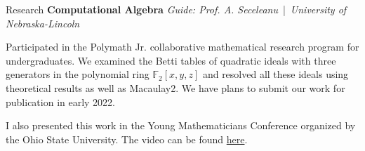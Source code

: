 \begin{rubric}{Research}
\entry*[2021] \textbf{Computational Algebra} \hfill \emph{Guide: Prof. A. Seceleanu} \,|\, \emph{University of Nebraska-Lincoln}

Participated in the Polymath Jr. collaborative mathematical research program for undergraduates. We examined the Betti tables of quadratic ideals with three generators in the polynomial ring $\mathbb{F}_{2}[x, y, z]$ and resolved all these ideals using theoretical results as well as Macaulay2. We have plans to submit our work for publication in early 2022.

I also presented this work in the Young Mathematicians Conference organized by the Ohio State University. The video can be found \href{https://www.youtube.com/watch?v=ax-zScZtL7Q}{here}.

\end{rubric}